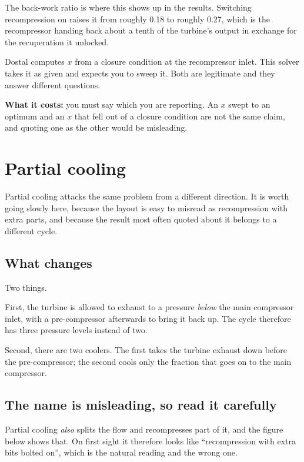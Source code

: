 \documentclass[11pt,a4paper]{report}
\begin{document}
The back-work ratio is where this shows up in the results. Switching
recompression on raises it from roughly \num{0.18} to roughly \num{0.27},
which is the recompressor handing back about a tenth of the turbine's
output in exchange for the recuperation it unlocked.

\begin{caveat}[title={Caveat: the split fraction is an input here, not a result}]
Dostal computes $x$ from a closure condition at the recompressor inlet. This
solver takes it as given and expects you to sweep it. Both are legitimate
and they answer different questions.

\textbf{What it costs:} you must say which you are reporting. An $x$ swept
to an optimum and an $x$ that fell out of a closure condition are not the
same claim, and quoting one as the other would be misleading.
\end{caveat}

\section{Partial cooling}

Partial cooling attacks the same problem from a different direction. It is
worth going slowly here, because the layout is easy to misread as
recompression with extra parts, and because the result most often quoted
about it belongs to a different cycle.

\subsection{What changes}

Two things.

First, the turbine is allowed to exhaust to a pressure \emph{below} the main
compressor inlet, with a pre-compressor afterwards to bring it back up. The
cycle therefore has three pressure levels instead of two.

Second, there are two coolers. The first takes the turbine exhaust down
before the pre-compressor; the second cools only the fraction that goes on
to the main compressor.

\subsection{The name is misleading, so read it carefully}
\label{sec:pcname}

Partial cooling \emph{also} splits the flow and recompresses part of it, and
the figure below shows that. On first sight it therefore looks like
``recompression with extra bits bolted on'', which is the natural reading
and the wrong one.
\end{document}
